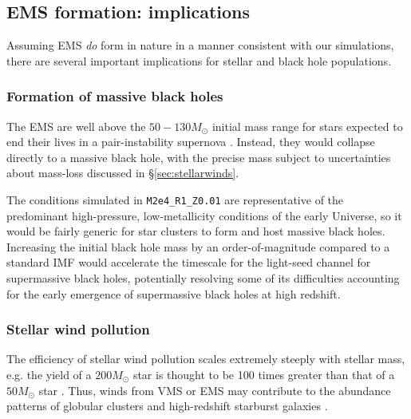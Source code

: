 \documentclass[apjl,twocolumn]{openjournal}
\begin{document}
\subsection{EMS formation: implications}
\label{sec:ems_implications}
Assuming EMS {\it do} form in nature in a manner consistent with our simulations, there are several important implications for stellar and black hole populations.

\subsubsection{Formation of massive black holes}
The EMS are well above the $50-130M_\odot$ initial mass range for stars expected to end their lives in a pair-instability supernova \citep{fowler:1964.pair.instability,rakavy:1967.pair.instability.stellar,barkat:1967.pair.instability.supernova,fraley:1968.pair.instability.supernova,heger:2002.pop3.nucleosynthesis,woosley:2007.pulsational.pair.instability,farmer:2019.pair.instability.bh.gap}. Instead, they would collapse directly to a massive black hole, with the precise mass subject to uncertainties about mass-loss discussed in \S\ref{sec:stellarwinds}.

The conditions simulated in \texttt{M2e4\_R1\_Z0.01} are representative of the predominant high-pressure, low-metallicity conditions of the early Universe, so it would be fairly generic for star clusters to form and host massive black holes. Increasing the initial black hole mass by an order-of-magnitude compared to a standard IMF would accelerate the timescale for the light-seed channel for supermassive black holes, potentially resolving some of its difficulties accounting for the early emergence of supermassive black holes at high redshift.

\subsubsection{Stellar wind pollution}
The efficiency of stellar wind pollution scales extremely steeply with stellar mass, e.g. the yield of a $200 M_\odot$ star is thought to be 100 times greater than that of a $50 M_\odot$ star \citep{higgins:2023.stellar.wind.yields,higgins:2025.stellar.wind.yields}. Thus, winds from VMS or EMS may contribute to the abundance patterns of globular clusters and high-redshift starburst galaxies \citep{prantzos:2006.gc.enrichment, bastian:2018.gc.abundances,pascale:2023.godzilla,senchyna:2024.gnz11, gieles:2025.inertial.inflow.ems, shi:2026.vms.pollution}.
\end{document}
